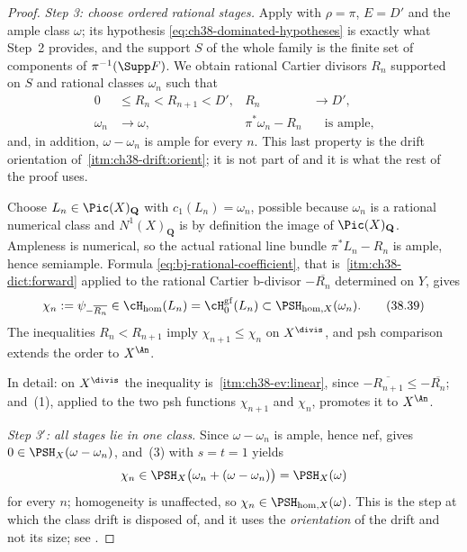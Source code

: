 \begin{proof}
\medskip
\noindent\emph{Step 3: choose ordered rational stages.}
Apply  with
$\rho=\pi$, $E=D'$ and the ample class $\omega$; its hypothesis
\eqref{eq:ch38-dominated-hypotheses} is exactly what Step~2 provides, and
the support $S$ of the whole family is the finite set of components of
$\pi^{-1}(\Supp F)$.  We obtain rational Cartier divisors $R_n$
supported on $S$ and rational classes $\omega_n$ such that
\[
 \begin{aligned}
 0&\le R_n<R_{n+1}<D',& R_n&\longrightarrow D',\\
 \omega_n&\longrightarrow\omega,
 &\pi^*\omega_n-R_n&\quad\text{is ample},
 \end{aligned}
\tag{38.38}\label{eq:bj-realization-rational-stages}
\]
and, in addition, $\omega-\omega_n$ is ample for every $n$.  This last
property is the drift orientation of
\,\cref{itm:ch38-drift:orient}; it is not part
of  and it is what the rest of
the proof uses.

Choose $L_n\in\Pic(X)_{\mathbf Q}$ with $c_1(L_n)=\omega_n$, possible
because $\omega_n$ is a rational numerical class and
$N^1(X)_{\mathbf Q}$ is by definition the image of
$\Pic(X)_{\mathbf Q}$.  Ampleness is numerical, so the actual rational
line bundle $\pi^*L_n-R_n$ is ample, hence semiample.  Formula
\eqref{eq:bj-rational-coefficient}, that is
\,\cref{itm:ch38-dict:forward} applied
to the rational Cartier b-divisor $-\overline{R_n}$ determined on
$Y$, gives
\[
 \chi_n:=\psi_{-\overline{R_n}}
       \in \cH_{\mathrm{hom}}(L_n)
       =\cH^{\mathrm{gf}}_0(L_n)
       \subset\PSH_{\mathrm{hom},X}(\omega_n).
\tag{38.39}\label{eq:bj-realization-gf-stages}
\]
The inequalities $R_n<R_{n+1}$ imply
$\chi_{n+1}\le\chi_n$ on $X^{\divis}$, and psh comparison extends
the order to $X^{\An}$.

In detail: on $X^{\divis}$ the inequality is
\,\cref{itm:ch38-ev:linear}, since
$-\overline{R_{n+1}}\leq-\overline{R_n}$; and
\,(1), applied to the two psh
functions $\chi_{n+1}$ and $\chi_n$, promotes it to $X^{\An}$.

\medskip
\noindent\emph{Step 3$'$: all stages lie in one class.}
Since $\omega-\omega_n$ is ample, hence nef,
 gives $0\in\PSH_X(\omega-\omega_n)$, and
\,(3) with $s=t=1$ yields
\[
 \chi_n\in\PSH_X\bigl(\omega_n+(\omega-\omega_n)\bigr)=\PSH_X(\omega)
\]
for every $n$; homogeneity is unaffected, so
$\chi_n\in\PSH_{\mathrm{hom},X}(\omega)$.  This is the step at which the
class drift is disposed of, and it uses the \emph{orientation} of the
drift and not its size; see .


\end{proof}
